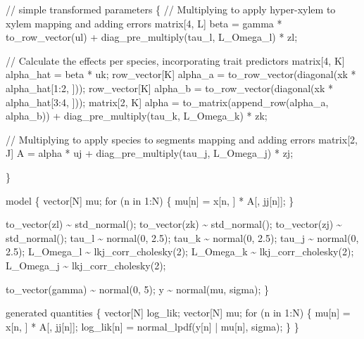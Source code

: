 \documentclass[
  12pt,
  letterpaper,
  DIV=11,
  numbers=noendperiod]{scrartcl}
\newenvironment{Shaded}{\begin{snugshade}}{\end{snugshade}}
\newcommand{\CommentTok}[1]{\textcolor[rgb]{0.37,0.37,0.37}{#1}}
\newcommand{\ControlFlowTok}[1]{\textcolor[rgb]{0.00,0.23,0.31}{#1}}
\newcommand{\DataTypeTok}[1]{\textcolor[rgb]{0.68,0.00,0.00}{#1}}
\newcommand{\DecValTok}[1]{\textcolor[rgb]{0.68,0.00,0.00}{#1}}
\newcommand{\FloatTok}[1]{\textcolor[rgb]{0.68,0.00,0.00}{#1}}
\newcommand{\KeywordTok}[1]{\textcolor[rgb]{0.00,0.23,0.31}{#1}}
\newcommand{\NormalTok}[1]{\textcolor[rgb]{0.00,0.23,0.31}{#1}}
\begin{document}
\begin{Shaded}
\begin{Highlighting}[]
\CommentTok{// simple}
\KeywordTok{transformed parameters}\NormalTok{ \{}
  \CommentTok{// Multiplying to apply hyper{-}xylem to xylem mapping and adding errors}
  \DataTypeTok{matrix}\NormalTok{[}\DecValTok{4}\NormalTok{, L] beta = gamma * to\_row\_vector(ul) + diag\_pre\_multiply(tau\_l, L\_Omega\_l) * zl;}

  \CommentTok{// Calculate the effects per species, incorporating trait predictors}
  \DataTypeTok{matrix}\NormalTok{[}\DecValTok{4}\NormalTok{, K] alpha\_hat = beta * uk;}
  \DataTypeTok{row\_vector}\NormalTok{[K] alpha\_a = to\_row\_vector(diagonal(xk * alpha\_hat[}\DecValTok{1}\NormalTok{:}\DecValTok{2}\NormalTok{, ]));}
  \DataTypeTok{row\_vector}\NormalTok{[K] alpha\_b = to\_row\_vector(diagonal(xk * alpha\_hat[}\DecValTok{3}\NormalTok{:}\DecValTok{4}\NormalTok{, ]));}
  \DataTypeTok{matrix}\NormalTok{[}\DecValTok{2}\NormalTok{, K] alpha = to\_matrix(append\_row(alpha\_a, alpha\_b)) + diag\_pre\_multiply(tau\_k, L\_Omega\_k) * zk;}

  \CommentTok{// Multiplying to apply species to segments mapping and adding errors}
  \DataTypeTok{matrix}\NormalTok{[}\DecValTok{2}\NormalTok{, J] A = alpha * uj + diag\_pre\_multiply(tau\_j, L\_Omega\_j) * zj;}

\NormalTok{\}}

\KeywordTok{model}\NormalTok{ \{}
  \DataTypeTok{vector}\NormalTok{[N] mu;}
  \ControlFlowTok{for}\NormalTok{ (n }\ControlFlowTok{in} \DecValTok{1}\NormalTok{:N) \{}
\NormalTok{    mu[n] = x[n, ] * A[, jj[n]];}
\NormalTok{  \}}

\NormalTok{  to\_vector(zl) \textasciitilde{} std\_normal();}
\NormalTok{  to\_vector(zk) \textasciitilde{} std\_normal();}
\NormalTok{  to\_vector(zj) \textasciitilde{} std\_normal();}
\NormalTok{  tau\_l \textasciitilde{} normal(}\DecValTok{0}\NormalTok{, }\FloatTok{2.5}\NormalTok{);}
\NormalTok{  tau\_k \textasciitilde{} normal(}\DecValTok{0}\NormalTok{, }\FloatTok{2.5}\NormalTok{);}
\NormalTok{  tau\_j \textasciitilde{} normal(}\DecValTok{0}\NormalTok{, }\FloatTok{2.5}\NormalTok{);}
\NormalTok{  L\_Omega\_l \textasciitilde{} lkj\_corr\_cholesky(}\DecValTok{2}\NormalTok{);}
\NormalTok{  L\_Omega\_k \textasciitilde{} lkj\_corr\_cholesky(}\DecValTok{2}\NormalTok{);}
\NormalTok{  L\_Omega\_j \textasciitilde{} lkj\_corr\_cholesky(}\DecValTok{2}\NormalTok{);}

\NormalTok{  to\_vector(gamma) \textasciitilde{} normal(}\DecValTok{0}\NormalTok{, }\DecValTok{5}\NormalTok{);}
\NormalTok{  y \textasciitilde{} normal(mu, sigma);}
\NormalTok{\}}

\KeywordTok{generated quantities}\NormalTok{ \{}
  \DataTypeTok{vector}\NormalTok{[N] log\_lik;}
  \DataTypeTok{vector}\NormalTok{[N] mu;}
  \ControlFlowTok{for}\NormalTok{ (n }\ControlFlowTok{in} \DecValTok{1}\NormalTok{:N) \{}
\NormalTok{    mu[n] = x[n, ] * A[, jj[n]];}
\NormalTok{    log\_lik[n] = normal\_lpdf(y[n] | mu[n], sigma);}
\NormalTok{  \}}
\NormalTok{\}}
\end{Highlighting}
\end{Shaded}
\end{document}
